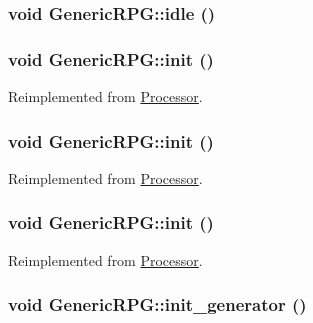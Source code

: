\hypertarget{classGenericRPG_661b35dacbf7bae62164df5fc1b73477}{
\subsubsection[{idle}]{\setlength{\rightskip}{0pt plus 5cm}void GenericRPG::idle ()}}
\label{classGenericRPG_661b35dacbf7bae62164df5fc1b73477}


\hypertarget{classGenericRPG_83b1fba5595a25b24b32374ec8e85020}{
\subsubsection[{init}]{\setlength{\rightskip}{0pt plus 5cm}void GenericRPG::init ()}}
\label{classGenericRPG_83b1fba5595a25b24b32374ec8e85020}




Reimplemented from \hyperlink{classProcessor_22e869ee49d974ad0ee7ee81961ab88f}{Processor}.\hypertarget{classGenericRPG_83b1fba5595a25b24b32374ec8e85020}{
\subsubsection[{init}]{\setlength{\rightskip}{0pt plus 5cm}void GenericRPG::init ()}}
\label{classGenericRPG_83b1fba5595a25b24b32374ec8e85020}




Reimplemented from \hyperlink{classProcessor_22e869ee49d974ad0ee7ee81961ab88f}{Processor}.\hypertarget{classGenericRPG_83b1fba5595a25b24b32374ec8e85020}{
\subsubsection[{init}]{\setlength{\rightskip}{0pt plus 5cm}void GenericRPG::init ()}}
\label{classGenericRPG_83b1fba5595a25b24b32374ec8e85020}




Reimplemented from \hyperlink{classProcessor_22e869ee49d974ad0ee7ee81961ab88f}{Processor}.\hypertarget{classGenericRPG_addf993ae78d1b14589750c78d095aa4}{
\subsubsection[{init\_\-generator}]{\setlength{\rightskip}{0pt plus 5cm}void GenericRPG::init\_\-generator ()}}
\label{classGenericRPG_addf993ae78d1b14589750c78d095aa4}


